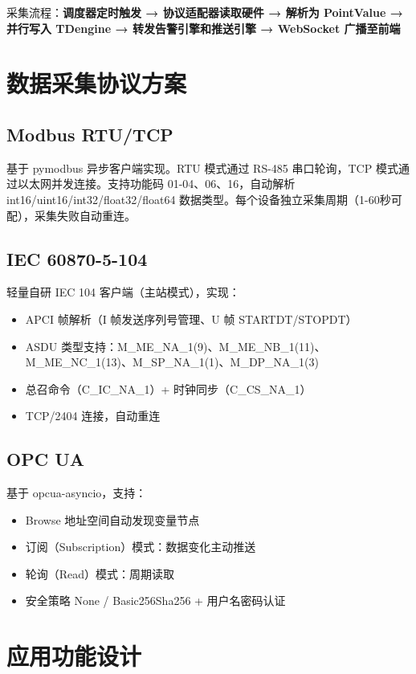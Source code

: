\documentclass[12pt,a4paper]{ctexart}
\begin{document}
采集流程：\textbf{调度器定时触发 → 协议适配器读取硬件 → 解析为 PointValue → 并行写入 TDengine → 转发告警引擎和推送引擎 → WebSocket 广播至前端}

\section{数据采集协议方案}

\subsection{Modbus RTU/TCP}

基于 pymodbus 异步客户端实现。RTU 模式通过 RS-485 串口轮询，TCP 模式通过以太网并发连接。支持功能码 01-04、06、16，自动解析 int16/uint16/int32/float32/float64 数据类型。每个设备独立采集周期（1-60秒可配），采集失败自动重连。

\subsection{IEC 60870-5-104}

轻量自研 IEC 104 客户端（主站模式），实现：
\begin{itemize}
  \item APCI 帧解析（I 帧发送序列号管理、U 帧 STARTDT/STOPDT）
  \item ASDU 类型支持：M\_ME\_NA\_1(9)、M\_ME\_NB\_1(11)、M\_ME\_NC\_1(13)、M\_SP\_NA\_1(1)、M\_DP\_NA\_1(3)
  \item 总召命令（C\_IC\_NA\_1）+ 时钟同步（C\_CS\_NA\_1）
  \item TCP/2404 连接，自动重连
\end{itemize}

\subsection{OPC UA}

基于 opcua-asyncio，支持：
\begin{itemize}
  \item Browse 地址空间自动发现变量节点
  \item 订阅（Subscription）模式：数据变化主动推送
  \item 轮询（Read）模式：周期读取
  \item 安全策略 None / Basic256Sha256 + 用户名密码认证
\end{itemize}

\section{应用功能设计}
\end{document}
